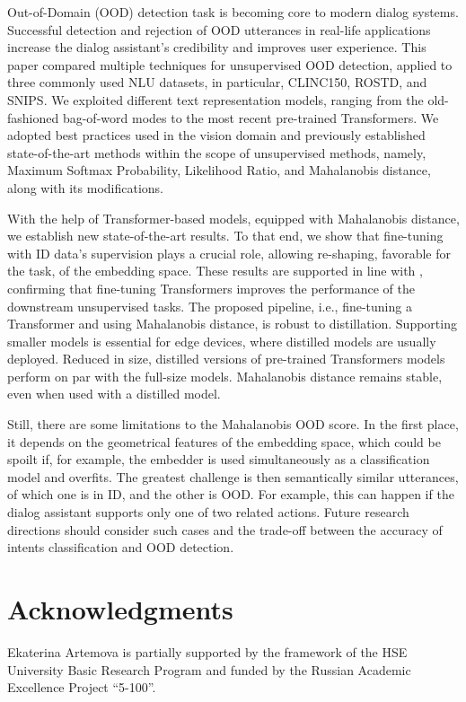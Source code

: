 \documentclass[letterpaper, final]{article} %
\begin{document}
Out-of-Domain (OOD) detection task is becoming core to modern dialog systems. Successful detection and rejection of OOD utterances in real-life applications increase the dialog assistant's credibility and improves user experience. This paper compared multiple techniques for unsupervised OOD detection, applied to three commonly used NLU datasets, in particular, CLINC150, ROSTD, and SNIPS. We exploited different text representation models, ranging from the old-fashioned bag-of-word modes to the most recent pre-trained Transformers. We adopted best practices used in the vision domain and previously established state-of-the-art methods within the scope of unsupervised methods, namely, Maximum Softmax Probability, Likelihood Ratio, and Mahalanobis distance, along with its modifications.

With the help of Transformer-based models, equipped with Mahalanobis distance, we establish new state-of-the-art results. To that end, we show that fine-tuning with ID data's supervision plays a crucial role, allowing re-shaping, favorable for the task, of the embedding space. These results are supported in line with \cite{reimers2019sentence}, confirming that fine-tuning Transformers improves the performance of the downstream unsupervised tasks. The proposed pipeline, i.e., fine-tuning a Transformer and using Mahalanobis distance, is robust to distillation. Supporting smaller models is essential for edge devices, where distilled models are usually deployed. Reduced in size, distilled versions of pre-trained Transformers models perform on par with the full-size models. Mahalanobis distance remains stable, even when used with a distilled model.

Still, there are some limitations to the Mahalanobis OOD score. In the first place, it depends on the geometrical features of the embedding space, which could be spoilt if, for example, the embedder is used simultaneously as a classification model and overfits. The greatest challenge is then semantically similar utterances, of which one is in ID, and the other is OOD. For example, this can happen if the dialog assistant supports only one of two related actions. Future research directions should consider such cases and the trade-off between the accuracy of intents classification and OOD detection.


\vspace{-1.02mm}
\section*{Acknowledgments}
Ekaterina Artemova is partially supported by the framework of the HSE University Basic Research Program and funded by the Russian Academic Excellence Project  ``5-100''.
\end{document}
